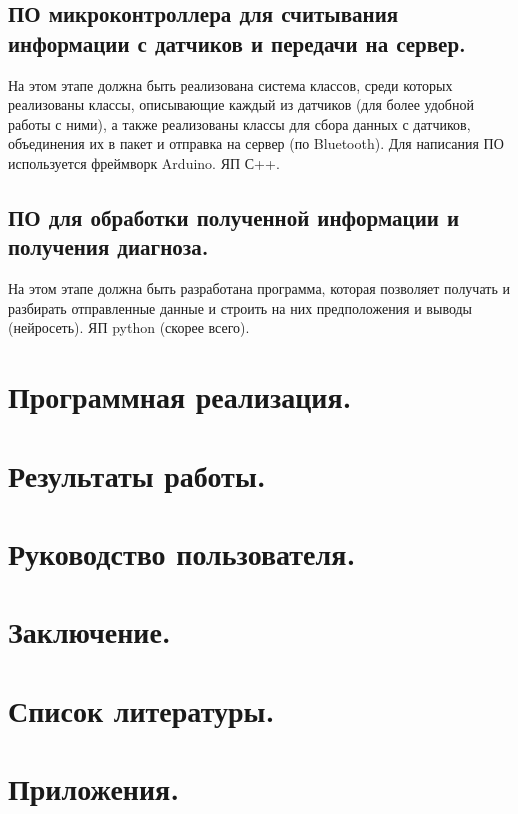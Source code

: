 \documentclass[a4document]{article}
\begin{document}
{{}

\subsection*{ПО микроконтроллера для считывания информации с датчиков и передачи на сервер.}
{
На этом этапе должна быть реализована система классов, среди которых реализованы классы, 
описывающие каждый из датчиков (для более удобной работы с ними), 
а также реализованы классы для сбора данных с датчиков, объединения их в пакет и отправка на сервер (по Bluetooth). 
Для написания ПО используется фреймворк Arduino. ЯП С++.
}

\subsection*{ПО для обработки полученной информации и получения диагноза.}
{
На этом этапе должна быть разработана программа, которая позволяет получать и разбирать отправленные данные и строить на них предположения и выводы (нейросеть). ЯП python (скорее всего).
}

}

{
\newpage
\section*{Программная реализация.} 
}

{
\newpage
\section*{Результаты работы.} 
}

{
\newpage
\section*{Руководство пользователя.} 
}

{
\newpage
\section*{Заключение.} 
}

{
\newpage
\section*{Список литературы.} 
}

{
\newpage
\section*{Приложения.} 
}
\end{document}
